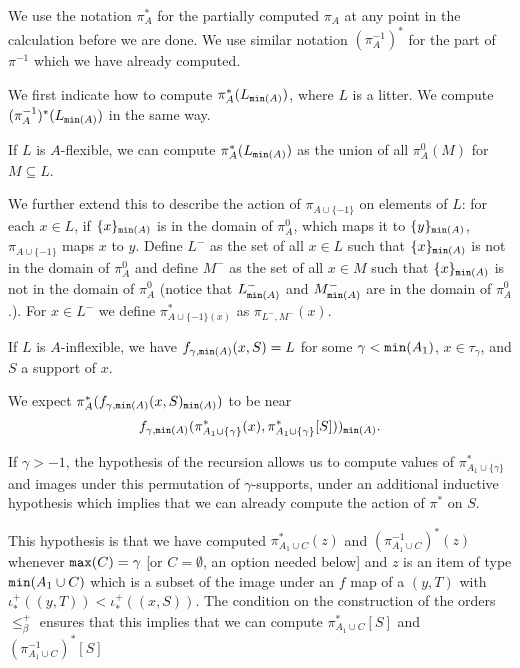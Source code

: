 \documentclass[112pt]{article}
\begin{document}
\begin{description}
We use the notation $\pi^*_A$ for the partially computed $\pi_A$ at any point in the calculation before we are done.  We use similar notation $(\pi^{-1}_A)^*$ for the part of $\pi^{-1}$ which we have already computed.

We first indicate how to compute $\pi^*_A(L_{{\tt min}(A)})$, where $L$ is a litter.  We compute  $(\pi^{-1}_A)^*(L_{{\tt min}(A)})$ in the same way.

If $L$ is $A$-flexible, we can compute $\pi^*_A(L_{{\tt min}(A)})$ as the union of all $\pi^0_A(M)$ for $M \subseteq L$.  

We further extend this to describe the action of $\pi_{A \cup \{-1\}}$ on elements of $L$:
for each $x \in L$, if $\{x\}_{{\tt min}(A)}$ is in the domain of $\pi^0_A$, which maps it to $\{y\}_{{\tt min}(A)}$, $\pi_{A \cup \{-1\}}$ maps $x$ to $y$.  Define $L^-$ as the set of all $x \in L$ such that
$\{x\}_{{\tt min}(A)}$ is not in the domain of $\pi^0_A$ and define $M^-$ as the set of all $x \in M$ such that
$\{x\}_{{\tt min}(A)}$ is not in the domain of $\pi^0_A$ (notice that $L^-_{{\tt min}(A)}$ and $M^-_{{\tt min}(A)}$ are in the domain of $\pi^0_A$.).  For $x \in L^-$ we define $\pi^*_{A\cup \{-1\}(x)}$ as $\pi_{L^-,M^-}(x)$.

If $L$ is $A$-inflexible, we have $f_{\gamma,{\tt min}(A)}(x,S) = L$ for some $\gamma<{\tt min}(A_1)$, $x \in \tau_\gamma$, and $S$ a support of $x$.

We expect $\pi^*_A(f_{\gamma,{\tt min}(A)}(x,S)_{{\tt min}(A)})$ to be near $$f_{ \gamma,{\tt min}(A)}(\pi^*_{A_1\cup \{\gamma\}}(x),\pi^*_{A_1\cup \{\gamma\}}[S]))_{{\tt min}(A)}.$$



If $\gamma>-1$, the hypothesis of the recursion allows us to compute values of $\pi^*_{A_1\cup \{\gamma\}}$ and images under this permutation of $\gamma$-supports,
under an additional inductive hypothesis which implies that we can already compute the action of $\pi^*$ on $S$.

This hypothesis is that  we have computed $\pi_{A_1 \cup C}^*(z)$ and $(\pi_{A_1 \cup C}^{-1})^*(z)$whenever ${\tt max}(C)=\gamma$ [or $C = \emptyset$, an option needed below] and $z$ is an item of type ${\tt min}(A_1 \cup C)$ which is a subset
of the image under an $f$ map of a $(y,T)$ with $\iota^+_*((y,T)) < \iota^+_*((x,S))$.  The condition on the construction of the orders
$\leq^+_\beta$ ensures that this implies that we can compute $\pi_{A_1 \cup C}^*[S]$ and $(\pi_{A_1 \cup C}^{-1})^*[S]$ 


\end{description}
\end{document}
